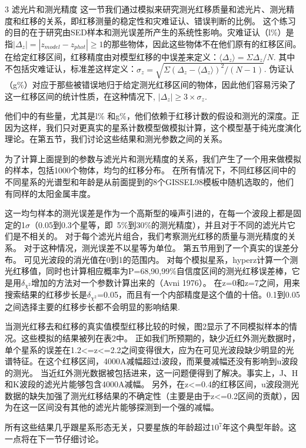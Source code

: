 \documentclass[8pt,a4paper,openany,twoside]{book}
\begin{document}
3 滤光片和测光精度
这一节我们通过模拟来研究测光红移质量和滤光片、测光精度和红移的关系，即红移测量的稳定性和灾难证认、错误判断的比例。
这个练习的目的在于研究由SED样本和测光误差所产生的系统性影响。灾难证认（l\%）是指$|\Delta_z|=|z_{model}-z_{phot}|\geq1$的那些物体，因此这些物体不在他们原有的红移区间。
在给定红移区间，红移精度由对模型红移的中误差来定义：$\langle\Delta_z\rangle=\Sigma\Delta_z/N$.
其中不包括灾难证认，标准差这样定义：$\sigma_z=\sqrt{\Sigma(\Delta_z-\langle\Delta_z\rangle)^2/(N-1)}$.
伪证认（g\%）对应于那些被错误地归于给定测光红移区间的物体，因此他们容易污染了这一红移区间的统计性质，在这种情况下,
$|\Delta_z|\geq3\times\sigma_z$.
 
他们中的有些量，尤其是l\% 和g\%，他们依赖于红移计数的假设和测光的深度。正因为这样，我们只对更真实的星系计数模型做模拟计算，这个模型基于纯光度演化理论。在第五节，我们讨论这些结果和测光参数之间的关系。
 
为了计算上面提到的参数与滤光片和测光精度的关系，我们产生了一个用来做模拟的样本，包括1000个物体，均匀的红移分布。
在所有情况下，不同红移区间中的不同星系的光谱型和年龄是从前面提到的8个GISSEL98模板中随机选取的，他们有同样的太阳金属丰度。
 
这一均匀样本的测光误差是作为一个高斯型的噪声引进的，在每一个波段上都是固定的1$\sigma$（0.05到0.3个星等，即~5\%到30\%的测光精度），并且对于不同的滤光片它们是不相关的。
对于每个滤光片组合，我们考察测光红移的质量与测光精度的关系。
对于这种情况，测光误差不以星等为单位。
第五节用到了一个真实的误差分布。
可见光波段的消光值在0到1的范围内。
对每个模拟星系，hyperz计算一个测光红移值，同时也计算相应概率为P=68,90,99\%自信度区间的测光红移误差棒，它是用$\delta_{\chi^2}$增加的方法对一个参数计算出来的（Avni 1976）。
在z=0和z=7之间，用来搜索结果的红移步长是$\delta_{\chi^2}$=0.05，而且有一个内部精度是这个值的十倍。0.1到0.05之间选择主要的红移步长都不会明显的影响结果.
 
当测光红移去和红移的真实值模型红移比较的时候，图2显示了不同模拟样本的情况。这些模拟的结果被列在表2中。
正如我们所预期的，缺少近红外测光数据时，单个星系的误差在1.2<=z<=2.2之间变得很大，应为在可见光波段缺少明显的光谱特征。在这个红移区间，4000A减幅超过i波段，而莱曼减幅还没有影响到u波段的测光。
当近红外测光数据被包括进来，这一问题便得到了解决。事实上，J、H和K波段的滤光片能够包含4000A减幅。
另外，在z<=0.4的红移区间，u波段测光数据的缺失加强了测光红移结果的不确定性（主要是由于z<=0.2区间的贡献），因为在这一区间没有其他的滤光片能够探测到一个强的减幅。
 
所有这些结果几乎跟星系形态无关，只要星族的年龄超过$10^7$年这个典型年龄。这一点将在下一节仔细讨论。
 
\end{document}
